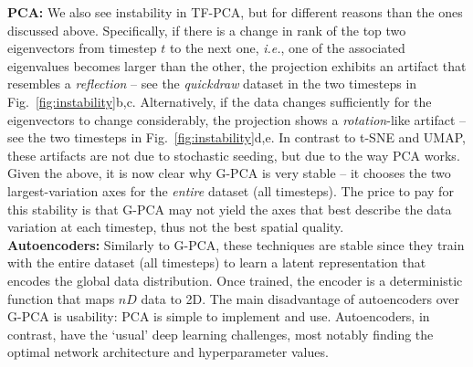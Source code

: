 \noindent\textbf{PCA:} We also see instability in TF-PCA, but for different reasons than the ones discussed above. Specifically, if there is a change in rank of the top two eigenvectors from timestep $t$ to the next one, \emph{i.e.}, one of the associated eigenvalues becomes larger than the other, the projection exhibits an artifact that resembles a \emph{reflection} -- see the \emph{quickdraw} dataset in the two timesteps in Fig.~\ref{fig:instability}b,c. Alternatively, if the data changes sufficiently for the eigenvectors to change considerably, the projection shows a \emph{rotation}-like artifact -- see the two timesteps in Fig.~\ref{fig:instability}d,e. In contrast to t-SNE and UMAP, these artifacts are not due to stochastic seeding, but due to the way PCA works. Given the above, it is now clear why G-PCA is very stable -- it chooses the two largest-variation axes for the \emph{entire} dataset (all timesteps). The price to pay for this stability is that G-PCA may not yield the axes that best describe the data variation at each timestep, thus not the best spatial quality.\\

\noindent\textbf{Autoencoders:} Similarly to G-PCA, these techniques are stable since they train with the entire dataset (all timesteps) to learn a latent representation that encodes the global data distribution. Once trained, the encoder is a deterministic function that maps $nD$ data to 2D. The main disadvantage of autoencoders over G-PCA is usability: PCA is simple to implement and use. Autoencoders, in contrast, have the `usual' deep learning challenges, most notably finding the optimal network architecture and hyperparameter values.



